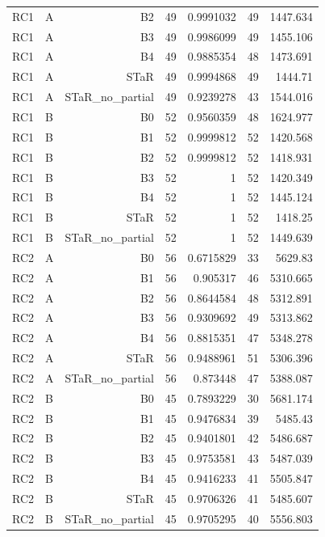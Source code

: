 \begin{longtable}{llrrrrr}
RC1 & A & B2 & 49 & 0.9991032 & 49 & 1447.634 \\
RC1 & A & B3 & 49 & 0.9986099 & 49 & 1455.106 \\
RC1 & A & B4 & 49 & 0.9885354 & 48 & 1473.691 \\
RC1 & A & STaR & 49 & 0.9994868 & 49 & 1444.71 \\
RC1 & A & STaR\_no\_partial & 49 & 0.9239278 & 43 & 1544.016 \\
RC1 & B & B0 & 52 & 0.9560359 & 48 & 1624.977 \\
RC1 & B & B1 & 52 & 0.9999812 & 52 & 1420.568 \\
RC1 & B & B2 & 52 & 0.9999812 & 52 & 1418.931 \\
RC1 & B & B3 & 52 & 1 & 52 & 1420.349 \\
RC1 & B & B4 & 52 & 1 & 52 & 1445.124 \\
RC1 & B & STaR & 52 & 1 & 52 & 1418.25 \\
RC1 & B & STaR\_no\_partial & 52 & 1 & 52 & 1449.639 \\
RC2 & A & B0 & 56 & 0.6715829 & 33 & 5629.83 \\
RC2 & A & B1 & 56 & 0.905317 & 46 & 5310.665 \\
RC2 & A & B2 & 56 & 0.8644584 & 48 & 5312.891 \\
RC2 & A & B3 & 56 & 0.9309692 & 49 & 5313.862 \\
RC2 & A & B4 & 56 & 0.8815351 & 47 & 5348.278 \\
RC2 & A & STaR & 56 & 0.9488961 & 51 & 5306.396 \\
RC2 & A & STaR\_no\_partial & 56 & 0.873448 & 47 & 5388.087 \\
RC2 & B & B0 & 45 & 0.7893229 & 30 & 5681.174 \\
RC2 & B & B1 & 45 & 0.9476834 & 39 & 5485.43 \\
RC2 & B & B2 & 45 & 0.9401801 & 42 & 5486.687 \\
RC2 & B & B3 & 45 & 0.9753581 & 43 & 5487.039 \\
RC2 & B & B4 & 45 & 0.9416233 & 41 & 5505.847 \\
RC2 & B & STaR & 45 & 0.9706326 & 41 & 5485.607 \\
RC2 & B & STaR\_no\_partial & 45 & 0.9705295 & 40 & 5556.803 \\
\hline
\end{longtable}
